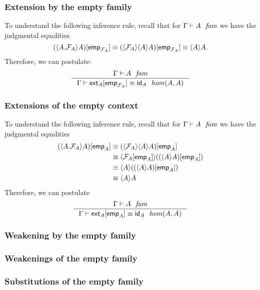 \subsubsection{Extension by the empty family}
To understand the following inference rule, recall that for $\jfam{\Gamma}{A}$
we have the judgmental equalities
\begin{equation*}
\subst{\tfemp{\mfam{A}}}{\ctxwk{\ctxext{A}{\mfam{A}}}{A}}
\jdeq
  \subst{\tfemp{\mfam{A}}}{\ctxwk{\mfam{A}}{{A}{A}}}
\jdeq
  \ctxwk{A}{A}.
\end{equation*}
Therefore, we can postulate:
\begin{equation*}
\inference
  { \jfam{\Gamma}{A}
    }
  { \jhomeq{\Gamma}{A}{A}{\subst{\tfemp{\mfam{A}}}{\tfext{A}}}{\idfunc[A]}
    }
\end{equation*}

\subsubsection{Extensions of the empty context}
To understand the following inference rule, recall that for $\jfam{\Gamma}{A}$
we have the judgmental equalities
\begin{align*}
\subst{\tfemp{A}}{\ctxwk{\ctxext{A}{\mfam{A}}}{A}}
& \jdeq 
  \subst{\tfemp{A}}{\ctxwk{\mfam{A}}{{A}{A}}}
  \\
& \jdeq 
  \ctxwk{\subst{\tfemp{A}}{\mfam{A}}}{\subst{\tfemp{A}}{\ctxwk{A}{A}}}
  \\
& \jdeq 
  \ctxwk{A}{\subst{\tfemp{A}}{\ctxwk{A}{A}}}
  \\
& \jdeq 
  \ctxwk{A}{A}
\end{align*}
Therefore, we can postulate
\begin{equation*}
\inference
  { \jfam{\Gamma}{A}
    }
  { \jhomeq{\Gamma}{A}{A}{\subst{\tfemp{A}}{\tfext{A}}}{\idfunc[A]}
    }
\end{equation*}

\subsubsection{Weakening by the empty family}

\subsubsection{Weakenings of the empty family}

\subsubsection{Substitutions of the empty family}

